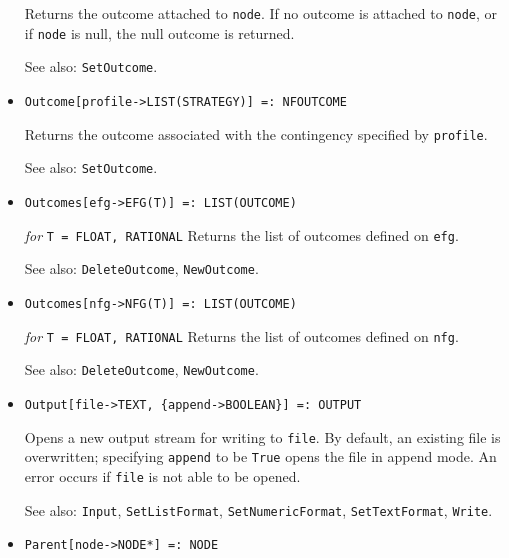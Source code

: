 \begin{itemize}
\bd
Returns the outcome attached to \verb+node+.  If no outcome is attached
to \verb+node+, or if \verb+node+ is null, the null outcome is returned.
\item [See also:] \verb+SetOutcome+.
\ed

\item{}
\protect \large \begin{verbatim}
Outcome[profile->LIST(STRATEGY)] =: NFOUTCOME
\end{verbatim}\normalsize

\bd
Returns the outcome associated with the contingency specified by
\verb+profile+.
\item [See also:] \verb+SetOutcome+.
\ed

\item{}
\protect \large \begin{verbatim}
Outcomes[efg->EFG(T)] =: LIST(OUTCOME)
\end{verbatim}\normalsize

{\it for} {\tt T = FLOAT, RATIONAL}
\bd
Returns the list of outcomes defined on \verb+efg+.
\item [See also:] \verb+DeleteOutcome+, \verb+NewOutcome+.
\ed

\item{}
\protect \large \begin{verbatim}
Outcomes[nfg->NFG(T)] =: LIST(OUTCOME)
\end{verbatim}\normalsize

{\it for} {\tt T = FLOAT, RATIONAL}
\bd
Returns the list of outcomes defined on \verb+nfg+.
\item [See also:] \verb+DeleteOutcome+, \verb+NewOutcome+.
\ed

\item{}
\protect \large \begin{verbatim}
Output[file->TEXT, {append->BOOLEAN}] =: OUTPUT
\end{verbatim}\normalsize

\bd
Opens a new output stream for writing to \verb+file+.  By default,
an existing file is overwritten; specifying \verb+append+ to be \verb+True+
opens the file in append mode.  An error occurs if \verb+file+ is not
able to be opened.
\item [See also:] \verb+Input+, \verb+SetListFormat+, \verb+SetNumericFormat+,
\verb+SetTextFormat+, \verb+Write+.
\ed


\item{}
\protect \large \begin{verbatim}
Parent[node->NODE*] =: NODE
\end{verbatim}\normalsize


\end{itemize}

